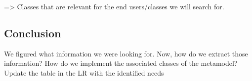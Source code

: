 => Classes that are relevant for the end users/classes we will search for.

\subsection{Conclusion}
We figured what information we were looking for. Now, how do we extract those information? How do we implement the associated classes of the metamodel?
Update the table in the LR with the identified needs


